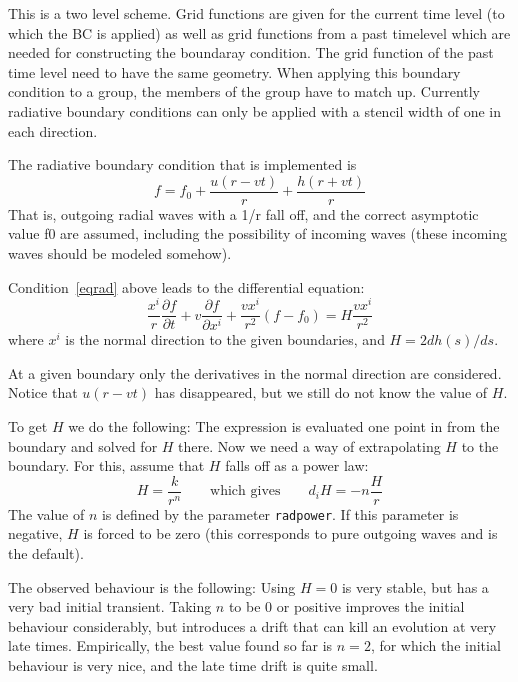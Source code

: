 \documentclass{article}
\begin{document}
This is a two level scheme. Grid functions are given for the current time 
level (to which the BC is applied) as well as grid functions from a past
timelevel which are needed for constructing the boundaray condition.
The grid function of the past time level need to have the same
geometry. When applying this boundary condition to a group, the
members of the group have to match up. Currently radiative boundary
conditions can only be applied with a stencil width of one in each
direction. 

The radiative boundary condition that is implemented is
\begin{equation}
\label{eqrad}
f = f_0 + \frac{u(r-vt)}{r}+\frac{h(r+vt)}{r}
\end{equation}
That is, outgoing radial waves with a 1/r
fall off, and the correct asymptotic value f0 are assumed, including
the possibility of incoming waves
(these incoming waves should be modeled somehow).

Condition~\ref{eqrad} above leads to the differential equation:
\begin{equation}
\frac{x^i}{r}\frac{\partial f}{\partial t}
+ v \frac{\partial f}{\partial x^i}
+\frac{v x^i}{r^2} (f-f_0)
= H \frac{v x^i}{r^2}  
\end{equation}
where $x^i$ is the normal direction to the given boundaries,
and $H = 2 dh(s)/ds$.

At a given boundary only the derivatives in the normal direction are 
considered.  Notice that $u(r-vt)$ has disappeared, but we still do 
not know the value of $H$.

To get $H$ we do the following:  The expression is evaluated one 
point in from the boundary and solved for $H$ there. Now we need a way of 
extrapolating $H$ to the boundary. For this, assume that 
$H$ falls off as a power law:
\begin{equation}
H = \frac{k}{r^n} \qquad \mbox{which gives} \qquad d_i H  =  - n \frac{H}{r}
\end{equation}
The value of $n$ is defined by the parameter {\tt radpower}.
If this parameter is negative, $H$ is forced to be zero (this
corresponds to pure outgoing waves and is the default).

The observed behaviour is the following:  Using $H=0$
is very stable, but has a very bad initial transient. Taking
$n$ to be 0 or positive improves the initial behaviour considerably,
but introduces a drift that can kill an evolution at very late
times.  Empirically, the best value found so far is $n=2$, for
which the initial behaviour is very nice, and the late time drift 
is quite small.
\end{document}
